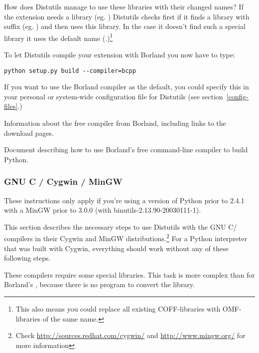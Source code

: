 \documentclass{howto}
\begin{document}
How does Distutils manage to use these libraries with their changed
names?  If the extension needs a library (eg. ) Distutils
checks first if it finds a library with suffix 
(eg. ) and then uses this library.  In the case it
doesn't find such a special library it uses the default name
(.)\footnote{This also means you could replace all
existing COFF-libraries with OMF-libraries of the same name.}

To let Distutils compile your extension with Borland \Cpp{} you now have
to type:

\begin{verbatim}
python setup.py build --compiler=bcpp
\end{verbatim}

If you want to use the Borland \Cpp{} compiler as the default, you
could specify this in your personal or system-wide configuration file
for Distutils (see section~\ref{config-files}.)
 
\begin{seealso}
    {Information about the free \Cpp{} compiler from Borland,
     including links to the download pages.}

    {Document describing how to use Borland's free command-line \Cpp
     compiler to build Python.}
\end{seealso}


\subsubsection{GNU C / Cygwin / MinGW}

These instructions only apply if you're using a version of Python prior 
to 2.4.1 with a MinGW prior to 3.0.0 (with binutils-2.13.90-20030111-1).

This section describes the necessary steps to use Distutils with the
GNU C/\Cpp{} compilers in their Cygwin and MinGW
distributions.\footnote{Check
\url{http://sources.redhat.com/cygwin/} and
\url{http://www.mingw.org/} for more information}
For a Python interpreter that was built with Cygwin, everything should
work without any of these following steps.

These compilers require some special libraries.
This task is more complex than for Borland's \Cpp, because there is no
program to convert the library.
 
\end{document}

